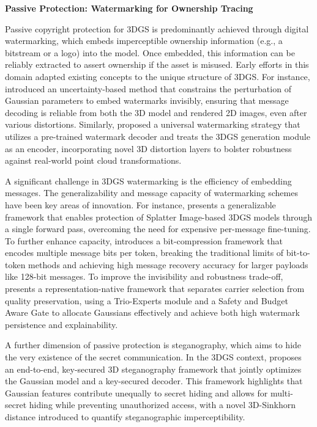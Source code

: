 \documentclass[11pt]{article}
\begin{document}
\textbf{Passive Protection: Watermarking for Ownership Tracing}

Passive copyright protection for 3DGS is predominantly achieved through digital watermarking, which embeds imperceptible ownership information (e.g., a bitstream or a logo) into the model. Once embedded, this information can be reliably extracted to assert ownership if the asset is misused. Early efforts in this domain adapted existing concepts to the unique structure of 3DGS. For instance, \cite{ref722} introduced an uncertainty-based method that constrains the perturbation of Gaussian parameters to embed watermarks invisibly, ensuring that message decoding is reliable from both the 3D model and rendered 2D images, even after various distortions. Similarly, \cite{ref723} proposed a universal watermarking strategy that utilizes a pre-trained watermark decoder and treats the 3DGS generation module as an encoder, incorporating novel 3D distortion layers to bolster robustness against real-world point cloud transformations.

A significant challenge in 3DGS watermarking is the efficiency of embedding messages. The generalizability and message capacity of watermarking schemes have been key areas of innovation. For instance, \cite{ref724} presents a generalizable framework that enables protection of Splatter Image-based 3DGS models through a single forward pass, overcoming the need for expensive per-message fine-tuning. To further enhance capacity, \cite{ref725} introduces a bit-compression framework that encodes multiple message bits per token, breaking the traditional limits of bit-to-token methods and achieving high message recovery accuracy for larger payloads like 128-bit messages. To improve the invisibility and robustness trade-off, \cite{ref726} presents a representation-native framework that separates carrier selection from quality preservation, using a Trio-Experts module and a Safety and Budget Aware Gate to allocate Gaussians effectively and achieve both high watermark persistence and explainability.

A further dimension of passive protection is steganography, which aims to hide the very existence of the secret communication. In the 3DGS context, \cite{ref727} proposes an end-to-end, key-secured 3D steganography framework that jointly optimizes the Gaussian model and a key-secured decoder. This framework highlights that Gaussian features contribute unequally to secret hiding and allows for multi-secret hiding while preventing unauthorized access, with a novel 3D-Sinkhorn distance introduced to quantify steganographic imperceptibility.
\end{document}
